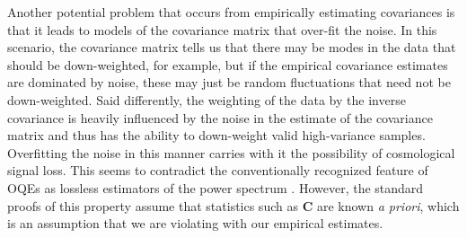 \documentclass[twocolumn,numberedappendix]{emulateapj} \shorttitle{New Limits on the 21 cm Power Spectrum at $z=8.4$}
\begin{document}
Another potential problem that occurs from empirically estimating covariances is that it
leads to models of the covariance matrix that over-fit the noise. In this
scenario, the covariance matrix tells us that there may be modes in the data
that should be down-weighted, for example, but if the empirical covariance estimates are dominated
by noise, these may just be random fluctuations that need not be down-weighted. Said differently, the weighting of the data by the inverse
covariance is heavily influenced by the noise in the estimate of the covariance
matrix and thus has the ability to down-weight valid high-variance samples. 
Overfitting the noise in this manner carries with it the possibility of cosmological signal loss.
This seems to contradict the conventionally recognized feature of OQEs as
lossless estimators of the power spectrum \citep{tegmark1997}. However,
the standard proofs of this property assume that statistics such as $\mathbf{C}$
are known \emph{a priori}, which is an assumption that we are violating with our
empirical estimates.
%
%


\end{document}

